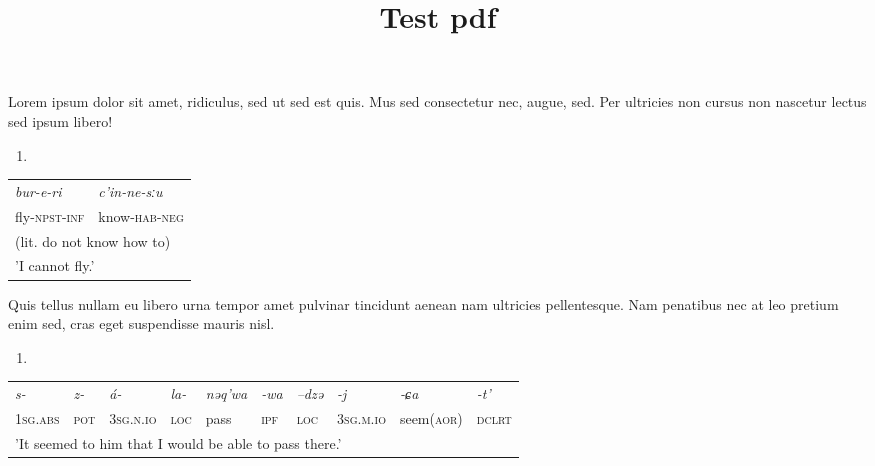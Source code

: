\documentclass[
]{article}
\title{Test pdf}
\author{}
\date{\vspace{-2.5em}}
\providecommand{\tightlist}{%
  \setlength{\itemsep}{0pt}\setlength{\parskip}{0pt}}
\begin{document}
\maketitle

Lorem ipsum dolor sit amet, ridiculus, sed ut sed est quis. Mus sed
consectetur nec, augue, sed. Per ultricies non cursus non nascetur
lectus sed ipsum libero!

\begin{enumerate}
\def\labelenumi{(\arabic{enumi})}
\tightlist
\item
\end{enumerate}

\begin{tabular}[t]{ll}

\textit{bur-e-ri} & \textit{c'in-ne-sːu}\\

fly-\textsc{npst}-\textsc{inf} & know-\textsc{hab}-\textsc{neg}\\

\multicolumn{2}{l}{\rule{0pt}{1em}(lit. do not know how to)}\\
\multicolumn{2}{l}{\rule{0pt}{1em}'I cannot fly.'}\\
\end{tabular}

Quis tellus nullam eu libero urna tempor amet pulvinar tincidunt aenean
nam ultricies pellentesque. Nam penatibus nec at leo pretium enim sed,
cras eget suspendisse mauris nisl.

\begin{enumerate}
\def\labelenumi{(\arabic{enumi})}
\setcounter{enumi}{1}
\tightlist
\item
\end{enumerate}

\begin{tabular}[t]{llllllllll}

\textit{s-} & \textit{z-} & \textit{á-} & \textit{la-} & \textit{nəq'wa} & \textit{-wa} & \textit{–dzə} & \textit{-j} & \textit{-ɕa} & \textit{-t'}\\

\textsc{1sg}.\textsc{abs} & \textsc{pot} & \textsc{3sg}.\textsc{n}.\textsc{io} & \textsc{loc} & pass & \textsc{ipf} & \textsc{loc} & \textsc{3sg}.\textsc{m}.\textsc{io} & seem(\textsc{aor}) & \textsc{dclrt}\\

\multicolumn{10}{l}{\rule{0pt}{1em}'It seemed to him that I would be able to pass there.'}\\
\end{tabular}
\end{document}
